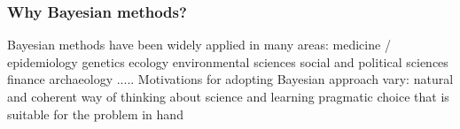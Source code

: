 


\begin{frame}[t]
\frametitle{Why Bayesian methods?}

\bibig
\I Bayesian methods have been widely applied in many areas:\vspace{1mm}
   \nestedbi
   \I medicine / epidemiology\vspace{1mm}
   \I genetics\vspace{1mm}
   \I ecology\vspace{1mm}
   \I environmental sciences\vspace{1mm}
   \I social and political sciences\vspace{1mm}
   \I finance\vspace{1mm}
   \I archaeology\vspace{1mm}
   \I .....\vspace{2mm}
   \nestedei
\I Motivations for adopting Bayesian approach vary:\vspace{1mm}
   \nestedbi
   \I natural and coherent way of thinking about science and learning\vspace{1mm}
   \I pragmatic choice that is suitable for the problem in hand\vspace{1mm}
   \nestedei
\eibig
\end{frame}


